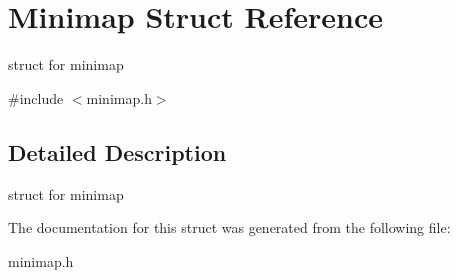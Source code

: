 \hypertarget{structMinimap}{}\section{Minimap Struct Reference}
\label{structMinimap}


struct for minimap  




{\ttfamily \#include $<$minimap.\+h$>$}



\subsection{Detailed Description}
struct for minimap 

The documentation for this struct was generated from the following file\+:\begin{DoxyCompactItemize}
\item 
minimap.\+h\end{DoxyCompactItemize}
